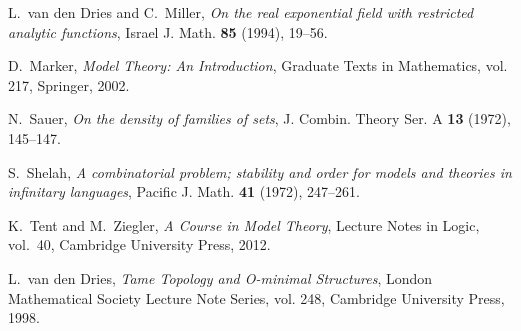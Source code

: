 \begin{thebibliography}{999}
    L.~van den Dries and C.~Miller, \emph{On the real exponential field with
    restricted analytic functions}, Israel J. Math. \textbf{85} (1994), 19--56.

    D.~Marker, \emph{Model Theory: An Introduction}, Graduate Texts in Mathematics,
    vol. 217, Springer, 2002.

    N.~Sauer, \emph{On the density of families of sets}, J. Combin. Theory Ser. A
    \textbf{13} (1972), 145--147.

    S.~Shelah, \emph{A combinatorial problem; stability and order for models and
    theories in infinitary languages}, Pacific J. Math. \textbf{41} (1972),
    247--261.

    K.~Tent and M.~Ziegler, \emph{A Course in Model Theory}, Lecture Notes in
    Logic, vol.~40, Cambridge University Press, 2012.

    L.~van den Dries, \emph{Tame Topology and O-minimal Structures}, London
    Mathematical Society Lecture Note Series, vol. 248, Cambridge University
    Press, 1998.



\end{thebibliography}